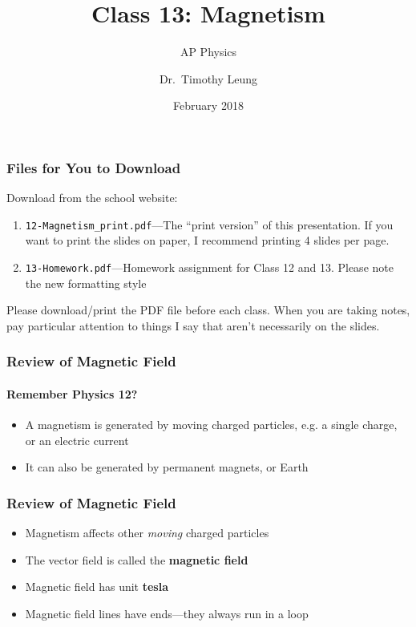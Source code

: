 \documentclass[12pt,aspectratio=169]{beamer}
\title{Class 13: Magnetism}
\subtitle{AP Physics}
\author[TML]{Dr.\ Timothy Leung}
\institute{Olympiads School}
\date{February 2018}
\newcommand{\mb}[1]{\mathbf{#1}}
\begin{document}
\begin{frame}
  \maketitle
\end{frame}



\begin{frame}
  \frametitle{Files for You to Download}
  Download from the school website:
  \begin{enumerate}
  \item\texttt{12-Magnetism\_print.pdf}---The ``print version'' of this
    presentation. If you want to print the slides on paper, I recommend
    printing 4 slides per page.
  \item\texttt{13-Homework.pdf}---Homework assignment for Class 12 and 13.
    Please note the new formatting style
  \end{enumerate}

  \vspace{.2in}Please download/print the PDF file before each class. When you
  are taking notes, pay particular attention to things I say that aren't
  necessarily on the slides.
\end{frame}


\begin{frame}
  \frametitle{Review of Magnetic Field}
  \framesubtitle{Remember Physics 12?}
  \begin{itemize}
  \item A magnetism is generated by moving charged particles, e.g.
    a single charge, or an electric current
  \item It can also be generated by permanent magnets, or Earth
  \end{itemize}
\end{frame}

\begin{frame}
  \frametitle{Review of Magnetic Field}
  \begin{itemize}
  \item Magnetism affects other \emph{moving} charged particles
  \item The vector field is called the \textbf{magnetic field}
  \item Magnetic field has unit \textbf{tesla}
  \item Magnetic field lines have ends---they always run in a loop
  \end{itemize}
\end{frame}
\end{document}
